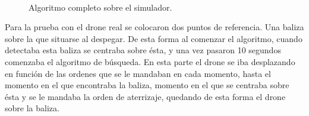\begin{figure}[H]
 \centering
	\\
 \caption{Algoritmo completo sobre el simulador. }
 \label{f:Algoritmo completo sobre el simulador. }
\end{figure}


\hspace{1cm} Para la prueba con el drone real se colocaron dos puntos de referencia. Una baliza sobre la que situarse al despegar. De esta forma al comenzar el algoritmo, cuando detectaba esta baliza se centraba sobre \'esta, y una vez pasaron 10 segundos comenzaba el algoritmo de b\'usqueda. En esta parte el drone se iba desplazando en funci\'on de las ordenes que se le mandaban en cada momento, hasta el momento en el que encontraba la baliza, momento en el que se centraba sobre \'esta y se le mandaba la orden de aterrizaje, quedando de esta forma el drone sobre la baliza. 
